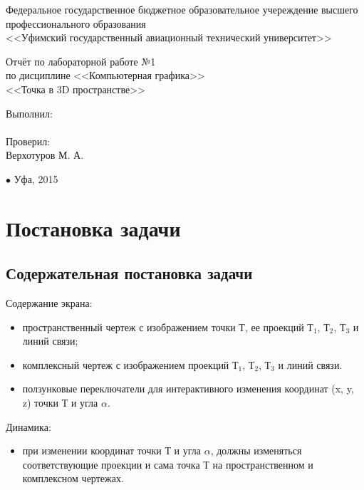 \documentclass[13pt]{extarticle}
\author{Пахтусов Н. Г., ПРО-306}
\begin{document}
\begin{center}
\thispagestyle{empty} 

Федеральное государственное бюджетное образовательное учереждение высшего \\
профессионального образования\\
<<Уфимский государственный авиационный технический университет>>
\vspace*{\fill}
\begingroup
\centering

Отчёт по лабораторной работе №1\\
по дисциплине <<Компьютерная графика>>\\
<<Точка в 3D пространстве>>

\endgroup
\vspace*{\fill}

\end{center}

\begin{flushright}

Выполнил:\\
\@author \\
Проверил: \\
Верхотуров М. А.

\end{flushright}

\begin{center}
$\bullet$ Уфа, 2015
\end{center}

\clearpage

\tableofcontents

\clearpage

\section{Постановка задачи}
\subsection{Содержательная постановка задачи}
	Содержание экрана:
	\begin{itemize}
		\item пространственный чертеж с изображением точки Т, ее проекций Т$_1$, Т$_2$, Т$_3$ и линий связи;
		\item  комплексный чертеж с изображением проекций Т$_1$, Т$_2$, Т$_3$ и линий связи.
		\item ползунковые переключатели для интерактивного изменения координат (x, y, z) точки Т и угла $\alpha$.
	\end{itemize}
	Динамика:
	\begin{itemize}
		\item при изменении координат точки Т и угла $\alpha$, должны изменяться соответствующие проекции и сама точка Т на пространственном и комплексном чертежах.
	\end{itemize}
\end{document}
